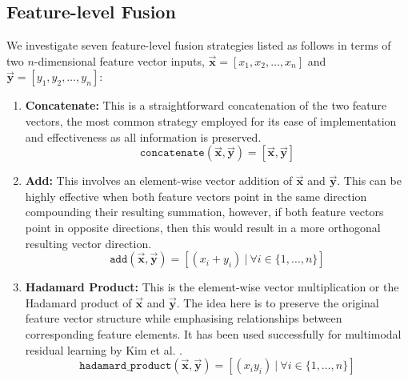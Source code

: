 \documentclass{mpaper}
\begin{document}
\subsection{Feature-level Fusion}
We investigate seven feature-level fusion strategies listed as follows in terms of two $n$-dimensional feature vector inputs, $\bm{\vec{x}} = [x_1, x_2, \ldots, x_n]$ and $\bm{\vec{y}} = [y_1, y_2, \ldots, y_n]$:
\vspace{-0.1cm}
\begin{enumerate}
    \itemsep-0.1cm
    \item \textbf{Concatenate:} This is a straightforward concatenation of the two feature vectors, the most common strategy employed for its ease of implementation and effectiveness as all information is preserved.
    $$\mathtt{concatenate}(\bm{\vec{x}}, \bm{\vec{y}}) = [\bm{\vec{x}}, \bm{\vec{y}}]$$

    \item \textbf{Add:} This involves an element-wise vector addition of $\bm{\vec{x}}$ and $\bm{\vec{y}}$. This can be highly effective when both feature vectors point in the same direction compounding their resulting summation, however, if both feature vectors point in opposite directions, then this would result in a more orthogonal resulting vector direction.
    $$\mathtt{add}(\bm{\vec{x}}, \bm{\vec{y}}) = \left[(x_i + y_i) \ | \ \forall i \in \{1, \ldots, n\}\right]$$
    
    \item \textbf{Hadamard Product:} This is the element-wise vector multiplication or the Hadamard product of $\bm{\vec{x}}$ and $\bm{\vec{y}}$. The idea here is to preserve the original feature vector structure while emphasising relationships between corresponding feature elements. It has been used successfully for multimodal residual learning by Kim et al. \cite{kim2016multimodal}.
    $$\mathtt{hadamard\_product}(\bm{\vec{x}}, \bm{\vec{y}}) = \left[(x_iy_i) \ | \ \forall i \in \{1, \ldots, n\}\right]$$
    

\end{enumerate}
\end{document}
